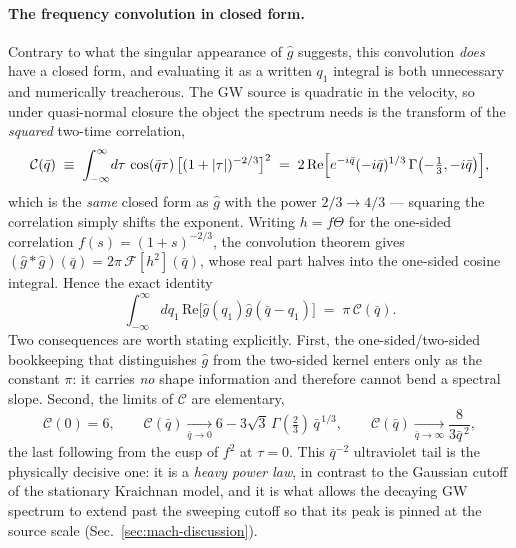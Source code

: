 \documentclass[10pt,prd,aps,nobibnotes,superscriptaddress,preprintnumbers,notitlepage]{revtex4-1}
\begin{document}
\paragraph{The frequency convolution in closed form.}
Contrary to what the singular appearance of $\hat g$ suggests, this convolution
\emph{does} have a closed form, and evaluating it as a written $q_1$ integral is
both unnecessary and numerically treacherous. The GW source is quadratic in the
velocity, so under quasi-normal closure the object the spectrum needs is the
transform of the \emph{squared} two-time correlation,
\begin{equation}
  \mathcal{C}(\bar q)\;\equiv\;\int_{-\infty}^{\infty}\!d\tau\,\cos(\bar q\tau)\,
  \bigl[(1+|\tau|)^{-2/3}\bigr]^{2}
  \;=\;2\,\mathrm{Re}\Bigl[e^{-i\bar q}(-i\bar q)^{1/3}\,
        \Gamma\bigl(-\tfrac13,-i\bar q\bigr)\Bigr],
  \label{eq:cosT-closed}
\end{equation}
which is the \emph{same} closed form as $\hat g$ with the power $2/3\to4/3$ --- squaring
the correlation simply shifts the exponent. Writing $h=f\Theta$ for the one-sided
correlation $f(s)=(1+s)^{-2/3}$, the convolution theorem gives $(\hat g*\hat g)(\bar q)=2\pi\,\mathcal{F}[h^{2}](\bar q)$,
whose real part halves into the one-sided cosine integral. Hence the exact identity
\begin{equation}
  \int_{-\infty}^{\infty}\!dq_1\,\mathrm{Re}\bigl[\hat g(q_1)\hat g(\bar q-q_1)\bigr]
  \;=\;\pi\,\mathcal{C}(\bar q).
  \label{eq:conv-equals-cosT}
\end{equation}
Two consequences are worth stating explicitly. First, the one-sided/two-sided
bookkeeping that distinguishes $\hat g$ from the two-sided kernel enters only as the
constant $\pi$: it carries \emph{no} shape information and therefore cannot bend a
spectral slope. Second, the limits of $\mathcal{C}$ are elementary,
\begin{equation}
  \mathcal{C}(0)=6,
  \qquad
  \mathcal{C}(\bar q)\xrightarrow[\bar q\to0]{}6-3\sqrt{3}\,\Gamma(\tfrac23)\,\bar q^{\,1/3},
  \qquad
  \mathcal{C}(\bar q)\xrightarrow[\bar q\to\infty]{}\frac{8}{3\bar q^{\,2}},
  \label{eq:cosT-limits}
\end{equation}
the last following from the cusp of $f^{2}$ at $\tau=0$. This $\bar q^{-2}$ ultraviolet
tail is the physically decisive one: it is a \emph{heavy power law}, in contrast to the
Gaussian cutoff of the stationary Kraichnan model, and it is what allows the decaying
GW spectrum to extend past the sweeping cutoff so that its peak is pinned at the source
scale (Sec.~\ref{sec:mach-discussion}).
\end{document}
